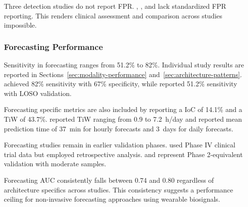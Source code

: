 Three detection studies do not report FPR. \textcite{singhrathoreDevelopmentMultimodalMachine2024}, \textcite{elemamAutomatedValidatedTool2025}, and \textcite{borujenyDetectionEpilepticSeizure2013} lack standardized FPR reporting. This renders clinical assessment and comparison across studies impossible.

\subsubsection{Forecasting Performance}

Sensitivity in forecasting ranges from 51.2\% to 82\%. Individual study results are reported in Sections~\ref{sec:modality-performance} and~\ref{sec:architecture-patterns}. \textcite{vielufSeizureMonitoringCombined2025} achieved 82\% sensitivity with 67\% specificity, while \textcite{meiselMachineLearningWristband2020} reported 51.2\% sensitivity with LOSO validation.

Forecasting specific metrics are also included by \textcite{meiselMachineLearningWristband2020} reporting a IoC of 14.1\% and a TiW of 43.7\%. \textcite{nasseriAmbulatorySeizureForecasting2021} reported TiW ranging from 0.9 to 7.2~h/day and \textcite{stirlingForecastingSeizureLikelihood2021} reported mean prediction time of 37~min for hourly forecasts and 3~days for daily forecasts.

Forecasting studies remain in earlier validation phases. \textcite{vielufSeizureMonitoringCombined2025} used Phase IV clinical trial data but employed retrospective analysis. \textcite{meiselMachineLearningWristband2020} and \textcite{nasseriAmbulatorySeizureForecasting2021} represent Phase 2-equivalent validation with moderate samples.

Forecasting AUC consistently falls between 0.74 and 0.80 regardless of architecture specifics across studies. This consistency suggests a performance ceiling for non-invasive forecasting approaches using wearable biosignals.
